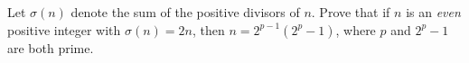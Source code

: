 Let $\sigma(n)$ denote the sum of the positive divisors of $n$. Prove that if $n$ is an \emph{even} positive integer with $\sigma(n)=2n$, then $n=2^{p-1}(2^p-1)$, where $p$ and $2^p-1$ are both prime.

